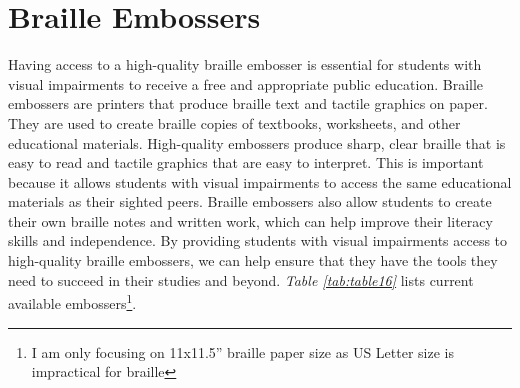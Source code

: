 \pagebreak\hypertarget{embossers}{}\section{Braille Embossers}\label{embossers}
Having access to a high-quality braille embosser is essential for students with visual impairments to receive a free and appropriate public education. Braille embossers are printers that produce braille text and tactile graphics on paper. They are used to create braille copies of textbooks, worksheets, and other educational materials. High-quality embossers produce sharp, clear braille that is easy to read and tactile graphics that are easy to interpret. This is important because it allows students with visual impairments to access the same educational materials as their sighted peers. Braille embossers also allow students to create their own braille notes and written work, which can help improve their literacy skills and independence. By providing students with visual impairments access to high-quality braille embossers, we can help ensure that they have the tools they need to succeed in their studies and beyond. \textit{Table \ref{tab:table16}} lists current available embossers\footnote{\raggedright I am only focusing on 11x11.5'' braille paper size as US Letter size is impractical for braille}.

\pagebreak 
 

